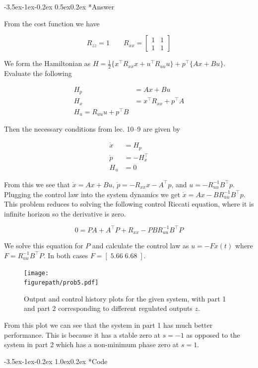 \documentclass[11pt,letterpaper,onecolumn,notitlepage]{article}
\makeatletter
\newcommand{\figurepath}{../fig/hw3}
\newcommand{\codepath}{../include/code/hw3}
\renewcommand\section{\@startsection{section}{1}{\z@}%
{-3.5ex\@plus-1ex\@minus-0.2ex}%
{1.0ex\@plus0.2ex}%
{\fontsize{12pt}{12pt}\selectfont\bfseries\sffamily}}
\renewcommand\subsection{\@startsection{subsection}{1}{\z@}%
{-3.5ex\@plus-1ex\@minus-0.2ex}%
{0.5ex\@plus0.2ex}%
{\fontsize{10pt}{10pt}\selectfont\bfseries\sffamily}}
\makeatother
\begin{document}
\subsection*{Answer}

From the cost function we have

\begin{equation*}
  R_{zz}=1
  \qquad
  R_{xx}=
  \begin{bmatrix}
    1 & 1 \\
    1 & 1
  \end{bmatrix}
\end{equation*}

We form the Hamiltonian as $H=\frac{1}{2}\{x^{\top}R_{xx}x+u^{\top}R_{uu}u\}+p^{\top}\{Ax+Bu\}$.
Evaluate the following

\begin{align*}
  H_{p}&=Ax+Bu \\
  H_{x}&=x^{\top}R_{xx}+p^{\top}A \\
  H_{u}=R_{uu}u+p^{\top}B
\end{align*}

Then the necessary conditions from lec. 10--9 are given by

\begin{align*}
  \dot{x}&=H_{p} \\
  \dot{p}&=-H_{x}^{\top} \\
  H_{u}&=0
\end{align*}

From this we see that $\dot{x}=Ax+Bu$, $\dot{p}=-R_{xx}x-A^{\top}p$, and $u=-R_{uu}^{-1}B^{\top}p$.
Plugging the control law into the system dynamics we get $\dot{x}=Ax-BR_{uu}^{-1}B^{\top}p$.
This problem reduces to solving the following control Riccati equation, where it is infinite horizon so the derivative is zero.

\begin{equation*}
  0=PA+A^{\top}P+R_{xx}-PBR_{uu}^{-1}B^{\top}P
\end{equation*}

We solve this equation for $P$ and calculate the control law as $u=-Fx(t)$ where $F=R_{uu}^{-1}B^{\top}P$.
In both cases $F=[\;5.66\;6.68\;]$.

\begin{figure}[H]
  \centering
  \texttt{[image: \\figurepath/prob5.pdf]}
  \caption{Output and control history plots for the given system, with part 1 and part 2 corresponding to different regulated outputs $z$.\label{fig:prob5}}
\end{figure}

From this plot we can see that the system in part 1 has much better performance.
This is because it has a stable zero at $s=-1$ as opposed to the system in part 2 which has a non-minimum phase zero at $s=1$.

\clearpage
\section*{Code}




\end{document}
